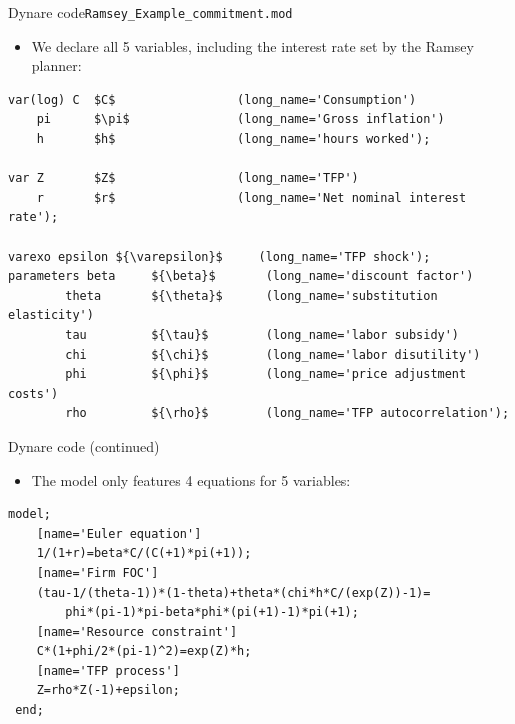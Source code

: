 \documentclass[handout,usepdftitle=false,xcolor=dvipsnames,aspectratio=169]{beamer}
\begin{document}
\begin{frame}[fragile]{Dynare code}{\texttt{Ramsey\_Example\_commitment.mod}}
  \begin{itemize}
    \item We declare all 5 variables, including the interest rate set by the Ramsey planner:
  \end{itemize}
  \small
  \begin{verbatim}
var(log) C  $C$                 (long_name='Consumption')
    pi      $\pi$               (long_name='Gross inflation')
    h       $h$                 (long_name='hours worked');

var Z       $Z$                 (long_name='TFP')
    r       $r$                 (long_name='Net nominal interest rate');

varexo epsilon ${\varepsilon}$     (long_name='TFP shock');
parameters beta     ${\beta}$       (long_name='discount factor')
        theta       ${\theta}$      (long_name='substitution elasticity')
        tau         ${\tau}$        (long_name='labor subsidy')
        chi         ${\chi}$        (long_name='labor disutility')
        phi         ${\phi}$        (long_name='price adjustment costs')
        rho         ${\rho}$        (long_name='TFP autocorrelation');
\end{verbatim}
\end{frame}





\begin{frame}[fragile]{Dynare code (continued)}
  \begin{itemize}
    \item The model only features 4 equations for 5 variables:
  \end{itemize}
  \begin{verbatim}
model;
    [name='Euler equation']
    1/(1+r)=beta*C/(C(+1)*pi(+1));
    [name='Firm FOC']
    (tau-1/(theta-1))*(1-theta)+theta*(chi*h*C/(exp(Z))-1)=
        phi*(pi-1)*pi-beta*phi*(pi(+1)-1)*pi(+1);
    [name='Resource constraint']
    C*(1+phi/2*(pi-1)^2)=exp(Z)*h;
    [name='TFP process']
    Z=rho*Z(-1)+epsilon;
 end;
\end{verbatim}
\end{frame}
\end{document}
